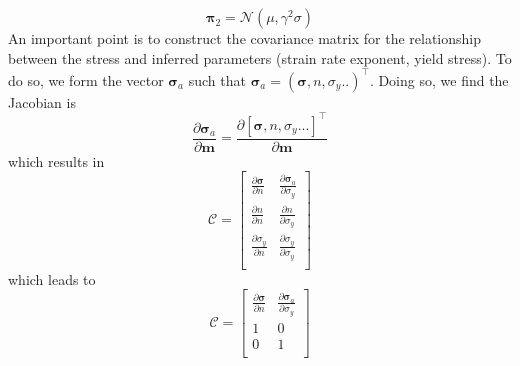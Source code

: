 \documentclass[12pt]{article}
\newcommand{\mm}{{\ensuremath{\boldsymbol{m}}}}
\newcommand{\ppi}{{\ensuremath{\boldsymbol{\pi}}}}
\newcommand{\ssigma}{{\ensuremath{\boldsymbol{\sigma}}}}
\begin{document}
{\begin{equation}
\ppi_2 = \mathcal N(\mu,\gamma^2\sigma)
\end{equation}
An important point is to construct the covariance matrix for the relationship between the stress and inferred parameters (strain rate exponent, yield stress). To do so, we form the vector $\ssigma_{a}$ such that  $\ssigma_a = (\ssigma, n,\sigma_y..)^\intercal$. Doing so, we find the Jacobian is
\begin{equation}
\frac{\partial \ssigma_a}{\partial \mm} = \frac{\partial [\ssigma, n, \sigma_y...]^\intercal}{\partial \mm}
\end{equation}
which results in 
\begin{equation}
\mathcal C = 
\begin{bmatrix}
\frac{\partial \ssigma}{\partial n} & \frac{\partial \ssigma_{a}}{\partial \sigma_y} \\
\frac{\partial n}{\partial n}& \frac{\partial n}{\partial \sigma_y} \\
\frac{\partial \sigma_y}{\partial n}& \frac{\partial \sigma_y}{\partial \sigma_y} \\
\end{bmatrix}
\end{equation}
which leads to 
\begin{equation}
\mathcal C = 
\begin{bmatrix}
\frac{\partial \ssigma}{\partial n} & \frac{\partial \ssigma_{a}}{\partial \sigma_y} \\
1 & 0\\
0 & 1 \\
\end{bmatrix}
\end{equation}

\begin{figure}[H]
\centering
\hspace{-1.2cm}
\end{figure}
}
\end{document}
